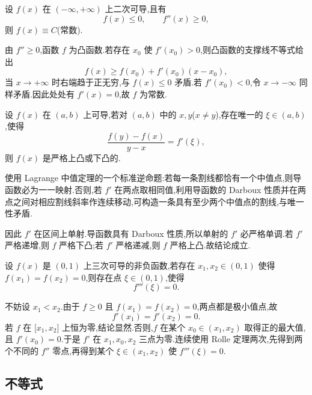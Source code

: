 \begin{example}
    设 $f(x)$ 在 $(-\infty,+\infty)$ 上二次可导,且有
    \[
        f(x)\leq0,
        \qquad f''(x)\geq0,
    \]
    则 $f(x)\equiv C$(常数).
\end{example}
\exampleblank

\begin{solution}
    由 $f''\geq0$,函数 $f$ 为凸函数.若存在 $x_0$ 使 $f'(x_0)>0$,则凸函数的支撑线不等式给出
    \[
        f(x)\geq f(x_0)+f'(x_0)(x-x_0),
    \]
    当 $x\to+\infty$ 时右端趋于正无穷,与 $f(x)\leq0$ 矛盾.若 $f'(x_0)<0$,令 $x\to-\infty$ 同样矛盾.因此处处有 $f'(x)=0$,故 $f$ 为常数.
\end{solution}

\begin{example}
    设 $f(x)$ 在 $(a,b)$ 上可导,若对 $(a,b)$ 中的 $x,y$($x\neq y$),存在唯一的 $\xi\in(a,b)$,使得
    \[
        \dfrac{f(y)-f(x)}{y-x}=f'(\xi),
    \]
    则 $f(x)$ 是严格上凸或下凸的.
\end{example}
\exampleblank

\begin{solution}
    使用 Lagrange 中值定理的一个标准逆命题:若每一条割线都恰有一个中值点,则导函数必为一一映射.否则,若 $f'$ 在两点取相同值,利用导函数的 Darboux 性质并在两点之间对相应割线斜率作连续移动,可构造一条具有至少两个中值点的割线,与唯一性矛盾.

    因此 $f'$ 在区间上单射.导函数具有 Darboux 性质,所以单射的 $f'$ 必严格单调.若 $f'$ 严格递增,则 $f$ 严格下凸;若 $f'$ 严格递减,则 $f$ 严格上凸.故结论成立.
\end{solution}

\begin{example}
    设 $f(x)$ 是 $(0,1)$ 上三次可导的非负函数,若存在 $x_1,x_2\in(0,1)$ 使得 $f(x_1)=f(x_2)=0$,则存在点 $\xi\in(0,1)$,使得
    \[
        f'''(\xi)=0.
    \]
\end{example}
\exampleblank

\begin{solution}
    不妨设 $x_1<x_2$.由于 $f\geq0$ 且 $f(x_1)=f(x_2)=0$,两点都是极小值点,故
    \[
        f'(x_1)=f'(x_2)=0.
    \]
    若 $f$ 在 $\lbrack x_1,x_2\rbrack$ 上恒为零,结论显然.否则,$f$ 在某个 $x_0\in(x_1,x_2)$ 取得正的最大值,且 $f'(x_0)=0$.于是 $f'$ 在 $x_1,x_0,x_2$ 三点为零.连续使用 Rolle 定理两次,先得到两个不同的 $f''$ 零点,再得到某个 $\xi\in(x_1,x_2)$ 使 $f'''(\xi)=0$.
\end{solution}



\subsection{不等式}

